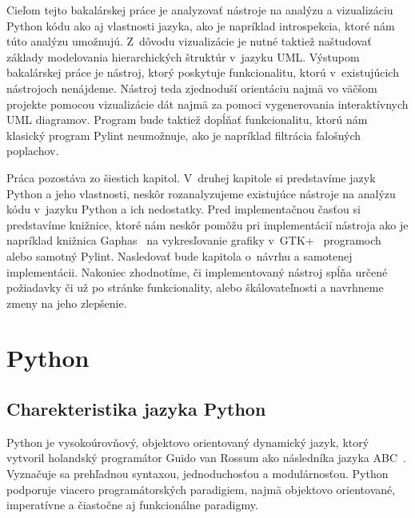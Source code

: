 \documentclass[11pt,oneside,final]{fithesis2}
\begin{document}
	Cieľom tejto bakalárskej práce je analyzovať nástroje na analýzu a vizualizáciu Python kódu ako aj vlastnosti jazyka, ako je napríklad introspekcia, ktoré nám túto analýzu umožnujú. Z~dôvodu vizualizácie je nutné taktiež naštudovať základy modelovania hierarchických štruktúr v~jazyku UML. Výstupom bakalárskej práce je nástroj, ktorý poskytuje funkcionalitu, ktorú v~existujúcich nástrojoch nenájdeme. Nástroj teda zjednoduší orientáciu najmä vo väčšom projekte pomocou vizualizácie dát najmä za pomoci vygenerovania interaktívnych UML diagramov. Program bude taktiež dopĺňať funkcionalitu, ktorú nám klasický program Pylint neumožnuje, ako je napríklad filtrácia falošných poplachov. 

	Práca pozostáva zo šiestich kapitol. V~druhej kapitole si predstavíme jazyk Python a jeho vlastnosti, neskôr rozanalyzujeme existujúce nástroje na analýzu kódu v~jazyku Python a ich nedostatky. Pred implementačnou časťou si predstavíme knižnice, ktoré nám neskôr pomôžu pri implementácií nástroja ako je napríklad knižnica Gaphas~\cite{gaphas} na vykresľovanie grafiky v~GTK+~\cite{gtkplus} programoch alebo samotný Pylint. Nasledovať bude kapitola o~návrhu a samotenej implementácii. Nakoniec zhodnotíme, či implementovaný nástroj spĺňa určené požiadavky či už po stránke funkcionality, alebo škálovateľnosti a navrhneme zmeny na jeho zlepšenie.
 


%
%
%

\chapter{Python}

	\section{Charekteristika jazyka Python}
	Python je vysokoúrovňový, objektovo orientovaný dynamický jazyk, ktorý vytvoril holandský programátor Guido van Rossum ako následníka jazyka ABC~\cite{abc}.
Vyznačuje sa prehľadnou syntaxou, jednoduchosťou a modulárnosťou. Python podporuje viacero programátorských paradigiem, najmä objektovo orientované, imperatívne a čiastočne aj funkcionálne paradigmy.
\end{document}
